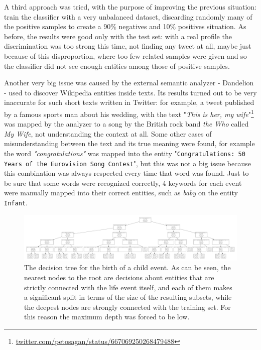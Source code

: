 A third approach was tried, with the purpose of improving the previous situation: train the classifier with a very unbalanced dataset, discarding randomly many of the positive samples to create a 90\% negatives and 10\% positives situation. As before, the results were good only with the test set: with a real profile the discrimination was too strong this time, not finding any tweet at all, maybe just because of this disproportion, where too few related samples were given and so the classifier did not see enough entities among those of positive samples.

Another very big issue was caused by the external semantic analyzer - Dandelion - used to discover Wikipedia entities inside texts. Its results turned out to be very inaccurate for such short texts written in Twitter: for example, a tweet published by a famous sports man about his wedding, with the text "\textit{This is her, my wife}"\footnote{\url{twitter.com/petosagan/status/667069250268479488}} was mapped by the analyzer to a song by the British rock band \emph{the Who} called \emph{My Wife}, not understanding the context at all. Some other cases of misunderstanding between the text and its true meaning were found, for example the word \emph{"congratulations"} was mapped into the entity "\texttt{Congratulations: 50 Years of the Eurovision Song Contest}", but this was not a big issue because this combination was always respected every time that word was found. Just to be sure that some words were recognized correctly, 4 keywords for each event were manually mapped into their correct entities, such as \emph{baby} on the entity \texttt{Infant}.

\begin{figure}
\centering
\includegraphics[width=%
1\textwidth]{img/decisiontree}
\caption{The decision tree for the birth of a child event. As can be seen, the nearest nodes to the root are decisions about entities that are strictly connected with the life event itself, and each of them makes a significant split in terms of the size of the resulting subsets, while the deepest nodes are strongly connected with the training set. For this reason the maximum depth was forced to be low.}
\label{fig:decisiontree}
\end{figure}

